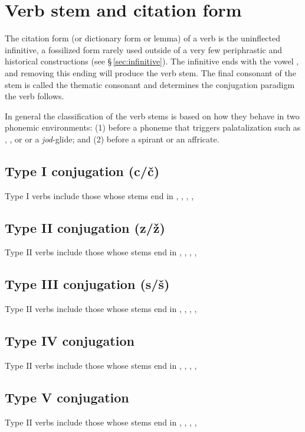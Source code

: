 \section{Verb stem and citation form}

\par The {\sc citation form} (or {\sc dictionary form} or {\sc lemma}) of a verb is the uninflected {\sc infinitive}, a fossilized form rarely used outside of a very few periphrastic and historical constructions (see \S\,\ref{sec:infinitive}). The infinitive ends with the vowel , and removing this ending will produce the verb stem. The final consonant  of the stem is called the thematic consonant and determines the conjugation paradigm the verb follows.

In general the classification of the verb stems is based on how they behave in two phonemic environments: (1) before a phoneme that triggers palatalization such as , ,  or  or a \emph{jod}-glide; and (2) before a spirant or an affricate.

\subsection{Type I conjugation (c/č)}
Type I verbs include those whose stems end in , , , ,

\subsection{Type II conjugation (z/ž)}
Type II verbs include those whose stems end in , , , ,

\subsection{Type III conjugation (s/š)}
Type II verbs include those whose stems end in , , , ,

\subsection{Type IV conjugation}
Type II verbs include those whose stems end in , , , ,

\subsection{Type V conjugation}
Type II verbs include those whose stems end in , , , ,


